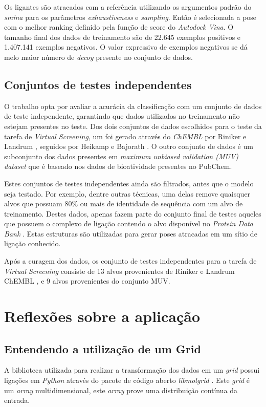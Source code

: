 \documentclass[utf8]{frontiersSCNS} %
\begin{document}
Os ligantes são atracados com a referência utilizando os argumentos padrão do \textit{smina} para os parâmetros \textit{exhaustiveness} e \textit{sampling}. Então é selecionada a pose com o melhor ranking definido pela função de score do \textit{Autodock Vina}. O tamanho final dos dados de treinamento são de 22.645 exemplos positivos e 1.407.141 exemplos negativos. O valor expressivo de exemplos negativos se dá melo maior número de \textit{decoy} presente no conjunto de dados. 

\subsection{Conjuntos de testes independentes}

O trabalho opta por avaliar a acurácia da classificação com um conjunto de dados de teste independente, garantindo que dados utilizados no treinamento não estejam presentes no teste. Dos dois conjuntos de dados escolhidos para o teste da tarefa de \textit{Virtual Screening}, um foi gerado através do  \textit{ChEMBL} por Riniker e Landrum \cite{Riniker2013}, seguidos por Heikamp e Bajorath \cite{Heikamp2011}. O outro conjunto de dados é um subconjunto dos dados presentes em \textit{maximum unbiased validation (MUV) dataset}\cite{Rohrer2009} que é baseado nos dados de bioatividade presentes no PubChem.

Estes conjuntos de testes independentes ainda são filtrados, antes que o modelo seja testado. Por exemplo, dentre outras técnicas, uma delas remove quaisquer alvos que possuam 80\% ou mais de identidade de sequência com um alvo de treinamento. Destes dados, apenas fazem parte do conjunto final de testes aqueles que possuem o complexo de ligação contendo o alvo disponível no \textit{Protein Data Bank}\cite{berman2000protein} . Estas estruturas são utilizadas para gerar poses atracadas em um sítio de ligação conhecido.

Após a curagem dos dados, os conjunto de testes independentes para a tarefa de \textit{Virtual Screening} consiste de 13 alvos provenientes de Riniker e Landrum ChEMBL \cite{Riniker2013}, e 9 alvos provenientes do conjunto MUV\cite{Rohrer2009}.

\section{Reflexões sobre a aplicação }

\subsection{Entendendo a utilização de um Grid}
A biblioteca utilizada para realizar a transformação dos dados em um \textit{grid} possui ligações em \textit{Python} através do pacote de código aberto \textit{libmolgrid} \cite{sunseri2019libmolgridgpuacceleratedmolecular}. Este \textit{grid} é um \textit{array} multidimensional, este \textit{array} prove uma distribuição contínua da entrada.
\end{document}
